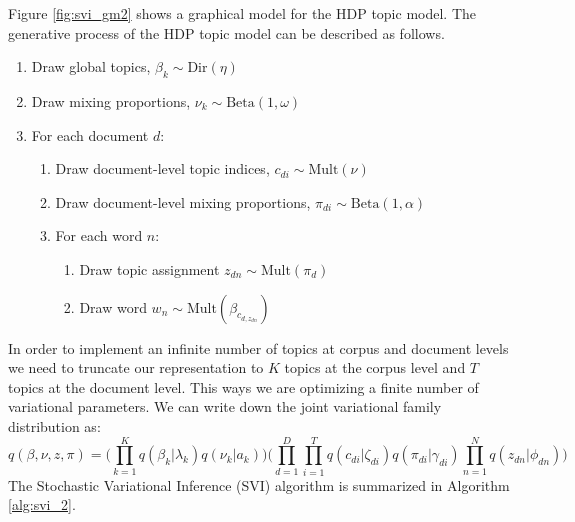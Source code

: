 Figure \ref{fig:svi_gm2} shows a graphical model for the HDP topic model. The generative process of the HDP topic model can be described as follows.
\begin{enumerate}
    \item Draw global topics, $\beta_k \sim \mathrm{Dir}(\eta)$
    \item Draw mixing proportions, $\nu_k \sim \mathrm{Beta}(1,\omega)$
    \item For each document $d$:
    \begin{enumerate}
        \item Draw document-level topic indices, $c_{di} \sim \mathrm{Mult}(\nu)$
        \item Draw document-level mixing proportions, $\pi_{di} \sim \mathrm{Beta}(1,\alpha)$
        \item For each word $n$:
        \begin{enumerate}
            \item Draw topic assignment $z_{dn} \sim \mathrm{Mult}(\pi_d)$
            \item Draw word $w_n \sim \mathrm{Mult}(\beta_{c_{d,z_{dn}}})$
        \end{enumerate}
    \end{enumerate}
\end{enumerate}

In order to implement an infinite number of topics at corpus and document levels we need to truncate our representation to $K$ topics at the corpus level and $T$ topics at the document level. This ways we are optimizing a finite number of variational parameters. We can write down the joint variational family distribution as:
\begin{equation}
    q(\beta,\nu,z,\pi) = \bigg(\prod_{k=1}^{K}q(\beta_k|\lambda_k)q(\nu_k|a_k)\bigg)\bigg(\prod_{d=1}^{D}\prod_{i=1}^{T}q(c_{di}|\zeta_{di})q(\pi_{di}|\gamma_{di})\prod_{n=1}^{N}q(z_{dn}|\phi_{dn}) \bigg)
\end{equation}
The Stochastic Variational Inference (SVI) algorithm is summarized in Algorithm \ref{alg:svi_2}.

